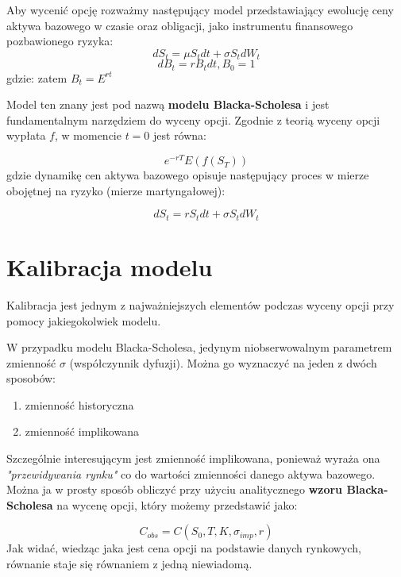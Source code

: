 \documentclass{pracamgr}
\begin{document}
Aby wycenić opcję rozważmy następujący model przedstawiający ewolucję ceny aktywa
bazowego w czasie oraz obligacji, jako instrumentu finansowego pozbawionego ryzyka:
\begin{equation}
  dS_t = \mu S_t dt + \sigma S_t d W_t 
\end{equation}
\begin{equation}
  dB_t = r B_t dt, B_0 = 1
\end{equation}
gdzie:
zatem $B_t = E^{rt}$

Model ten znany jest pod nazwą \textbf{modelu Blacka-Scholesa} i jest fundamentalnym narzędziem do wyceny opcji.
Zgodnie z teorią wyceny opcji wypłata $f$, w momencie $t = 0$ jest równa:

\begin{equation}
  e^{-rT} E(f(S_T))
\end{equation}
gdzie dynamikę cen aktywa bazowego opisuje następujący proces w mierze obojętnej na ryzyko (mierze martyngałowej):

\begin{equation}
  dS_t = r S_t dt + \sigma S_t d W_t 
\end{equation}


\section{Kalibracja modelu}
Kalibracja jest jednym z najważniejszych elementów podczas wyceny opcji przy pomocy jakiegokolwiek modelu.  

W przypadku modelu Blacka-Scholesa, jedynym niobserwowalnym parametrem zmienność $\sigma$ (współczynnik dyfuzji).
Można go wyznaczyć na jeden z dwóch sposobów:
\begin{enumerate}
  \item zmienność historyczna
  \item zmienność implikowana
\end{enumerate}

Szczególnie interesującym jest zmienność implikowana, ponieważ wyraża ona \textit{"przewidywania rynku"} co 
do wartości zmienności danego aktywa bazowego. 
Można ja w prosty sposób obliczyć przy użyciu analitycznego \textbf{wzoru Blacka-Scholesa} na wycenę opcji, który 
możemy przedstawić jako:

\begin{equation}
  C_{obs} = C(S_0, T, K, \sigma_{imp}, r)
\end{equation}
Jak widać, wiedząc jaka jest cena opcji na podstawie danych rynkowych, równanie staje się równaniem z jedną niewiadomą. 
\end{document}
